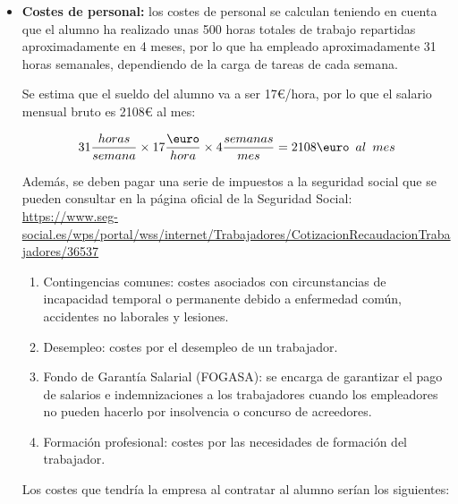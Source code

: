 \begin{itemize}
    \item \textbf{Costes de personal:} los costes de personal se calculan teniendo en cuenta que el alumno ha realizado unas 500 horas totales de trabajo repartidas aproximadamente en 4 meses, por lo que ha empleado aproximadamente 31 horas semanales, dependiendo de la carga de tareas de cada semana.

Se estima que el sueldo del alumno va a ser 17€/hora, por lo que el salario mensual bruto es 2108€ al mes:

$$ 31\frac{horas}{semana}\times17\frac{\text{\euro}}{hora}\times4\frac{semanas}{mes}=2108\text{\euro}\hspace{0.5em}al\hspace{0.5em}mes  $$

Además, se deben pagar una serie de impuestos a la seguridad social que se pueden consultar en la página oficial de la Seguridad Social: \url{https://www.seg-social.es/wps/portal/wss/internet/Trabajadores/CotizacionRecaudacionTrabajadores/36537}

\begin{enumerate}
    \item Contingencias comunes: costes asociados con circunstancias de incapacidad temporal o permanente debido a enfermedad común, accidentes no laborales y lesiones.
    \item Desempleo: costes por el desempleo de un trabajador.
    \item Fondo de Garantía Salarial (FOGASA): se encarga de garantizar el pago de salarios e indemnizaciones a los trabajadores cuando los empleadores no pueden hacerlo por insolvencia o concurso de acreedores.
    \item Formación profesional: costes por las necesidades de formación del trabajador.
\end{enumerate}

Los costes que tendría la empresa al contratar al alumno serían los siguientes:


\end{itemize}
